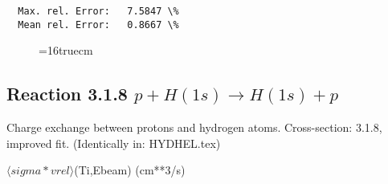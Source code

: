 \documentclass[12pt,dvipdfmx]{article}
\begin{document}
\begin{small}
\begin{verbatim}
  Max. rel. Error:   7.5847 \%
  Mean rel. Error:   0.8667 \%

\end{verbatim}\end{small}


\begin{figure} \label{2.3.9H3}
\epsfxsize=16truecm
\end{figure}
\newpage
\subsection{
Reaction 3.1.8  $ p + H(1s) \rightarrow H(1s) + p   $
}

 Charge exchange between protons and hydrogen
 atoms. Cross-section:  3.1.8, improved fit. (Identically in: HYDHEL.tex)

$  \langle sigma*vrel \rangle$(Ti,Ebeam)  (cm**3/s)
\end{document}
